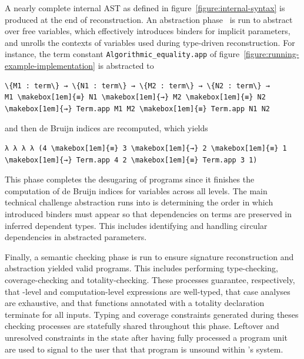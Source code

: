 A nearly complete internal \ac{AST} as defined in figure~\ref{figure:internal-syntax} is produced at the end of reconstruction.
An abstraction phase~\cite{germain2010implementation} is run to abstract over free variables, which effectively introduces binders for implicit parameters, and unrolls the contexts of variables used during type-driven reconstruction.
For instance, the \LF term constant \verb|Algorithmic_equality.app| of figure~\ref{figure:running-example-implementation} is abstracted to

\bigskip
\begin{Verbatim}[commandchars=\\\{\}, baselinestretch=1]
\{M1 : term\} → \{N1 : term\} → \{M2 : term\} → \{N2 : term\} →
M1 \makebox[1em]{≡} N1 \makebox[1em]{→} M2 \makebox[1em]{≡} N2 \makebox[1em]{→} Term.app M1 M2 \makebox[1em]{≡} Term.app N1 N2
\end{Verbatim}

\noindent
and then de Bruijn indices are recomputed, which yields

\bigskip
\begin{Verbatim}[commandchars=\\\{\}, baselinestretch=1]
λ λ λ λ (4 \makebox[1em]{≡} 3 \makebox[1em]{→} 2 \makebox[1em]{≡} 1 \makebox[1em]{→} Term.app 4 2 \makebox[1em]{≡} Term.app 3 1)
\end{Verbatim}

\noindent
This phase completes the desugaring of \Beluga programs since it finishes the computation of de Bruijn indices for variables across all levels.
The main technical challenge abstraction runs into is determining the order in which introduced binders must appear so that dependencies on terms are preserved in inferred dependent types.
This includes identifying and handling circular dependencies in abstracted parameters.

Finally, a semantic checking phase is run to ensure signature reconstruction and abstraction yielded valid programs.
This includes performing type-checking, coverage-checking and totality-checking.
These processes guarantee, respectively, that \LF-level and computation-level expressions are well-typed, that case analyses are exhaustive, and that functions annotated with a totality declaration terminate for all inputs.
Typing and coverage constraints generated during theses checking processes are statefully shared throughout this phase.
Leftover and unresolved constraints in the state after having fully processed a program unit are used to signal to the user that that program is unsound within \Beluga's system.

